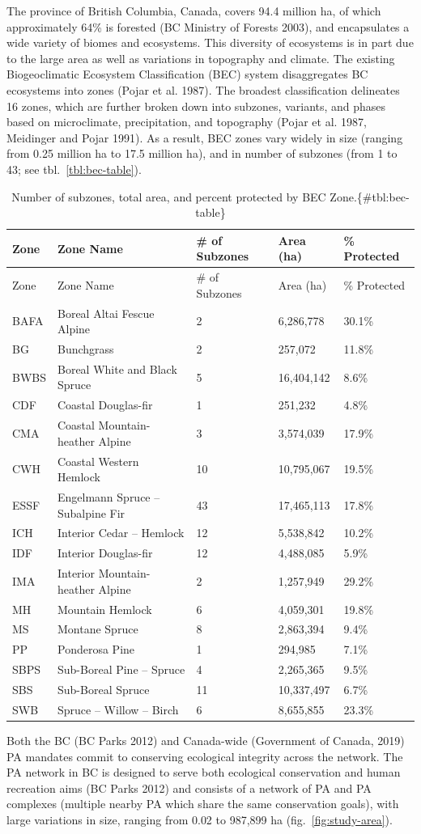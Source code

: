 \documentclass[11pt]{article}
\begin{document}
The province of British Columbia, Canada, covers 94.4 million ha, of
which approximately 64\% is forested (BC Ministry of Forests 2003), and
encapsulates a wide variety of biomes and ecosystems. This diversity of
ecosystems is in part due to the large area as well as variations in
topography and climate. The existing Biogeoclimatic Ecosystem
Classification (BEC) system disaggregates BC ecosystems into zones
(Pojar et al. 1987). The broadest classification delineates 16 zones,
which are further broken down into subzones, variants, and phases based
on microclimate, precipitation, and topography (Pojar et al. 1987,
Meidinger and Pojar 1991). As a result, BEC zones vary widely in size
(ranging from 0.25 million ha to 17.5 million ha), and in number of
subzones (from 1 to 43; see tbl.~\ref{tbl:bec-table}).

\begin{longtable}[]{@{}lllll@{}}
\caption{Number of subzones, total area, and percent protected by BEC
Zone.\{\#tbl:bec-table\}}\tabularnewline
\toprule
Zone & Zone Name & \# of Subzones & Area (ha) & \%
Protected\tabularnewline
\midrule
\endfirsthead
\toprule
Zone & Zone Name & \# of Subzones & Area (ha) & \%
Protected\tabularnewline
\midrule
\endhead
BAFA & Boreal Altai Fescue Alpine & 2 & 6,286,778 &
30.1\%\tabularnewline
BG & Bunchgrass & 2 & 257,072 & 11.8\%\tabularnewline
BWBS & Boreal White and Black Spruce & 5 & 16,404,142 &
8.6\%\tabularnewline
CDF & Coastal Douglas-fir & 1 & 251,232 & 4.8\%\tabularnewline
CMA & Coastal Mountain-heather Alpine & 3 & 3,574,039 &
17.9\%\tabularnewline
CWH & Coastal Western Hemlock & 10 & 10,795,067 & 19.5\%\tabularnewline
ESSF & Engelmann Spruce -- Subalpine Fir & 43 & 17,465,113 &
17.8\%\tabularnewline
ICH & Interior Cedar -- Hemlock & 12 & 5,538,842 & 10.2\%\tabularnewline
IDF & Interior Douglas-fir & 12 & 4,488,085 & 5.9\%\tabularnewline
IMA & Interior Mountain-heather Alpine & 2 & 1,257,949 &
29.2\%\tabularnewline
MH & Mountain Hemlock & 6 & 4,059,301 & 19.8\%\tabularnewline
MS & Montane Spruce & 8 & 2,863,394 & 9.4\%\tabularnewline
PP & Ponderosa Pine & 1 & 294,985 & 7.1\%\tabularnewline
SBPS & Sub-Boreal Pine -- Spruce & 4 & 2,265,365 & 9.5\%\tabularnewline
SBS & Sub-Boreal Spruce & 11 & 10,337,497 & 6.7\%\tabularnewline
SWB & Spruce -- Willow -- Birch & 6 & 8,655,855 & 23.3\%\tabularnewline
\bottomrule
\end{longtable}

Both the BC (BC Parks 2012) and Canada-wide (Government of Canada, 2019)
PA mandates commit to conserving ecological integrity across the
network. The PA network in BC is designed to serve both ecological
conservation and human recreation aims (BC Parks 2012) and consists of a
network of PA and PA complexes (multiple nearby PA which share the same
conservation goals), with large variations in size, ranging from 0.02 to
987,899 ha (fig.~\ref{fig:study-area}).
\end{document}
